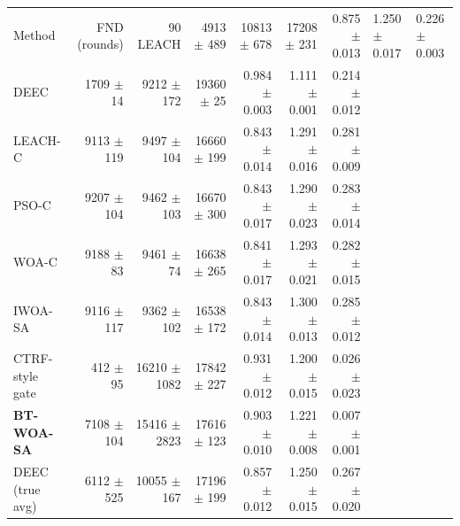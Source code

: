 \begin{tabular}{lrrrrrr}
\toprule
Method & FND (rounds) & 90 %
\midrule
LEACH & 4913 $\pm$ 489 & 10813 $\pm$ 678 & 17208 $\pm$ 231 & 0.875 $\pm$ 0.013 & 1.250 $\pm$ 0.017 & 0.226 $\pm$ 0.003 \\
DEEC & 1709 $\pm$ 14 & 9212 $\pm$ 172 & 19360 $\pm$ 25 & 0.984 $\pm$ 0.003 & 1.111 $\pm$ 0.001 & 0.214 $\pm$ 0.012 \\
LEACH-C & 9113 $\pm$ 119 & 9497 $\pm$ 104 & 16660 $\pm$ 199 & 0.843 $\pm$ 0.014 & 1.291 $\pm$ 0.016 & 0.281 $\pm$ 0.009 \\
PSO-C & 9207 $\pm$ 104 & 9462 $\pm$ 103 & 16670 $\pm$ 300 & 0.843 $\pm$ 0.017 & 1.290 $\pm$ 0.023 & 0.283 $\pm$ 0.014 \\
WOA-C & 9188 $\pm$ 83 & 9461 $\pm$ 74 & 16638 $\pm$ 265 & 0.841 $\pm$ 0.017 & 1.293 $\pm$ 0.021 & 0.282 $\pm$ 0.015 \\
IWOA-SA & 9116 $\pm$ 117 & 9362 $\pm$ 102 & 16538 $\pm$ 172 & 0.843 $\pm$ 0.014 & 1.300 $\pm$ 0.013 & 0.285 $\pm$ 0.012 \\
CTRF-style gate & 412 $\pm$ 95 & 16210 $\pm$ 1082 & 17842 $\pm$ 227 & 0.931 $\pm$ 0.012 & 1.200 $\pm$ 0.015 & 0.026 $\pm$ 0.023 \\
\textbf{BT-WOA-SA} & 7108 $\pm$ 104 & 15416 $\pm$ 2823 & 17616 $\pm$ 123 & 0.903 $\pm$ 0.010 & 1.221 $\pm$ 0.008 & 0.007 $\pm$ 0.001 \\
DEEC (true avg) & 6112 $\pm$ 525 & 10055 $\pm$ 167 & 17196 $\pm$ 199 & 0.857 $\pm$ 0.012 & 1.250 $\pm$ 0.015 & 0.267 $\pm$ 0.020 \\
\bottomrule
\end{tabular}